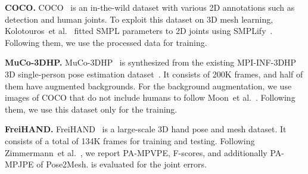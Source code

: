 \documentclass[runningheads]{llncs}
\begin{document}
\noindent\textbf{COCO.}
COCO~\cite{lin2014mscoco} is an in-the-wild dataset with various 2D annotations such as detection and human joints.
To exploit this dataset on 3D mesh learning, Kolotouros~et al.~\cite{kolotouros2019spin} fitted SMPL parameters to 2D joints using SMPLify~\cite{bogo2016keep}.
Following them, we use the processed data for training.

\noindent \textbf{MuCo-3DHP.}
MuCo-3DHP~\cite{mehta2018muco} is synthesized from the existing MPI-INF-3DHP 3D single-person pose estimation dataset~\cite{mehta2017monocular}. 
It consists of 200K frames, and half of them have augmented backgrounds.
For the background augmentation, we use images of COCO that do not include humans to follow Moon~et al.~\cite{moon2019camera}.
Following them, we use this dataset only for the training.

\noindent\textbf{FreiHAND.}
FreiHAND~\cite{chris2019Freihand} is a large-scale 3D hand pose and mesh dataset.
It consists of a total of 134K frames for training and testing.
Following Zimmermann~et al.~\cite{chris2019Freihand}, we report PA-MPVPE, F-scores, and additionally PA-MPJPE of Pose2Mesh.
 is evaluated for the joint errors.

\begin{table}[t]
\setlength{\tabcolsep}{1pt}
\setlength{\belowcaptionskip}{3pt plus 3pt minus 2pt}
\centering
{}
\end{table}
\vspace{-2mm}
\end{document}
